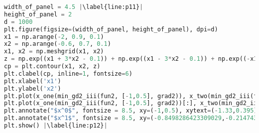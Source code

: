 \begin{lstlisting}[language=Python, label={lst:code4}, mathescape=true, breaklines=true, escapechar=|]
width_of_panel = 4.5 |\label{line:p11}|
height_of_panel = 2
d = 1000
plt.figure(figsize=(width_of_panel, height_of_panel), dpi=d)
x1 = np.arange(-2, 0.9, 0.1)
x2 = np.arange(-0.6, 0.7, 0.1)
x1, x2 = np.meshgrid(x1, x2)
z = np.exp((x1 + 3*x2 - 0.1)) + np.exp((x1 - 3*x2 - 0.1)) + np.exp((-x1 - 0.1))
cp = plt.contour(x1, x2, z)
plt.clabel(cp, inline=1, fontsize=6)
plt.xlabel('x1')
plt.ylabel('x2')
plt.plot(x_one(min_gd2_iii(fun2, [-1,0.5], grad2)), x_two(min_gd2_iii(fun2, [-1,0.5], grad2)), color='lightseagreen')
plt.plot(x_one(min_gd2_iii(fun2, [-1,0.5], grad2))[:], x_two(min_gd2_iii(fun2, [-1,0.5], grad2))[:], "or", markerfacecolor="None", markeredgecolor='black', markeredgewidth=1.1, markersize=2.6)
plt.annotate("$x^0$", fontsize = 8.5, xy=(-1,0.5), xytext=(-1.33,0.395), arrowprops=dict(arrowstyle = '-|>', connectionstyle = 'Arc3',facecolor='r'))
plt.annotate("$x^1$", fontsize = 8.5, xy=(-0.8498286423309029,-0.21474344992625538), xytext=(-1.3,-0.35), arrowprops=dict(arrowstyle = '-|>', connectionstyle = 'Arc3',facecolor='r'))
plt.show() |\label{line:p12}|
\end{lstlisting}


